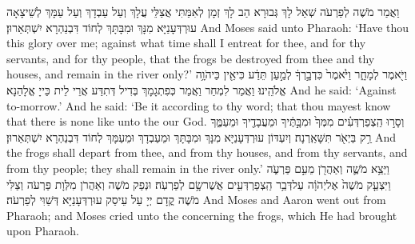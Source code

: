 {וַאֲמַר מֹשֶׁה לְפַרְעֹה שְׁאַל לָךְ גְּבוּרָא הַב לָךְ זְמָן לְאִמַּתִּי אֲצַלֵּי עֲלָךְ וְעַל עַבְדָךְ וְעַל עַמָּךְ לְשֵׁיצָאָה עוּרְדְּעָנַיָּא מִנָּךְ וּמִבָּתָּךְ לְחוֹד דִּבְנַהְרָא יִשְׁתְּאַרוּן׃}
{And Moses said unto Pharaoh: ‘Have thou this glory over me; against what time shall I entreat for thee, and for thy servants, and for thy people, that the frogs be destroyed from thee and thy houses, and remain in the river only?’}{}
{וַיֹּ֖אמֶר לְמָחָ֑ר וַיֹּ֙אמֶר֙ כִּדְבָ֣רְךָ֔ לְמַ֣עַן תֵּדַ֔ע כִּי\maqqaf אֵ֖ין כַּיהֹוָ֥ה אֱלֹהֵֽינוּ׃}
{וַאֲמַר לִמְחַר וַאֲמַר כְּפִתְגָמָךְ בְּדִיל דְּתִדַּע אֲרֵי לֵית כַּייָ אֱלָהַנָא׃}
{And he said: ‘Against to-morrow.’ And he said: ‘Be it according to thy word; that thou mayest know that there is none like unto the \lord\space our God.}{}
{וְסָר֣וּ הַֽצְפַרְדְּעִ֗ים מִמְּךָ֙ וּמִבָּ֣תֶּ֔יךָ וּמֵעֲבָדֶ֖יךָ וּמֵעַמֶּ֑ךָ רַ֥ק בַּיְאֹ֖ר תִּשָּׁאַֽרְנָה׃}
{וְיִעְדּוֹן עוּרְדְּעָנַיָּא מִנָּךְ וּמִבָּתָּךְ וּמֵעַבְדָךְ וּמֵעַמָּךְ לְחוֹד דִּבְנַהְרָא יִשְׁתְּאַרוּן׃}
{And the frogs shall depart from thee, and from thy houses, and from thy servants, and from thy people; they shall remain in the river only.’}{}
{וַיֵּצֵ֥א מֹשֶׁ֛ה וְאַהֲרֹ֖ן מֵעִ֣ם פַּרְעֹ֑ה וַיִּצְעַ֤ק מֹשֶׁה֙ אֶל\maqqaf יְהֹוָ֔ה עַל\maqqaf דְּבַ֥ר הַֽצְפַרְדְּעִ֖ים אֲשֶׁר\maqqaf שָׂ֥ם לְפַרְעֹֽה׃}
{וּנְפַק מֹשֶׁה וְאַהֲרֹן מִלְּוָת פַּרְעֹה וְצַלִּי מֹשֶׁה קֳדָם יְיָ עַל עֵיסַק עוּרְדְּעָנַיָּא דְּשַׁוִּי לְפַרְעֹה׃}
{And Moses and Aaron went out from Pharaoh; and Moses cried unto the \lord\space concerning the frogs, which He had brought upon Pharaoh.}{}
